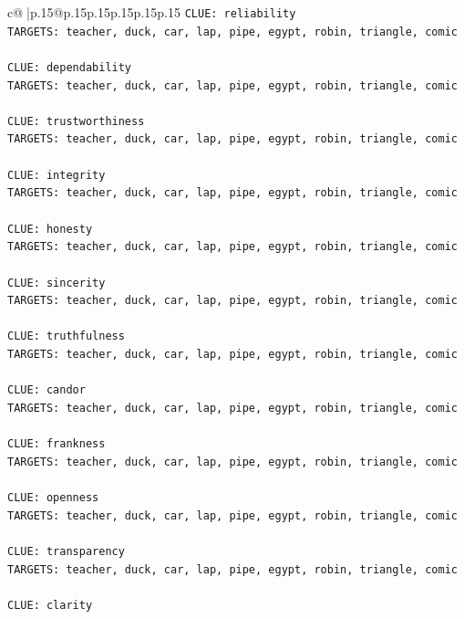 \documentclass{article}
\begin{document}
{\begin{supertabular}{c@{$\;$}|p{.15\linewidth}@{}p{.15\linewidth}p{.15\linewidth}p{.15\linewidth}p{.15\linewidth}p{.15\linewidth}}
{{{\texttt{CLUE: reliability} \\
\texttt{TARGETS: teacher, duck, car, lap, pipe, egypt, robin, triangle, comic} \\
\\ 
\texttt{CLUE: dependability} \\
\texttt{TARGETS: teacher, duck, car, lap, pipe, egypt, robin, triangle, comic} \\
\\ 
\texttt{CLUE: trustworthiness} \\
\texttt{TARGETS: teacher, duck, car, lap, pipe, egypt, robin, triangle, comic} \\
\\ 
\texttt{CLUE: integrity} \\
\texttt{TARGETS: teacher, duck, car, lap, pipe, egypt, robin, triangle, comic} \\
\\ 
\texttt{CLUE: honesty} \\
\texttt{TARGETS: teacher, duck, car, lap, pipe, egypt, robin, triangle, comic} \\
\\ 
\texttt{CLUE: sincerity} \\
\texttt{TARGETS: teacher, duck, car, lap, pipe, egypt, robin, triangle, comic} \\
\\ 
\texttt{CLUE: truthfulness} \\
\texttt{TARGETS: teacher, duck, car, lap, pipe, egypt, robin, triangle, comic} \\
\\ 
\texttt{CLUE: candor} \\
\texttt{TARGETS: teacher, duck, car, lap, pipe, egypt, robin, triangle, comic} \\
\\ 
\texttt{CLUE: frankness} \\
\texttt{TARGETS: teacher, duck, car, lap, pipe, egypt, robin, triangle, comic} \\
\\ 
\texttt{CLUE: openness} \\
\texttt{TARGETS: teacher, duck, car, lap, pipe, egypt, robin, triangle, comic} \\
\\ 
\texttt{CLUE: transparency} \\
\texttt{TARGETS: teacher, duck, car, lap, pipe, egypt, robin, triangle, comic} \\
\\ 
\texttt{CLUE: clarity} \\
}}}
\end{supertabular}}
\end{document}

